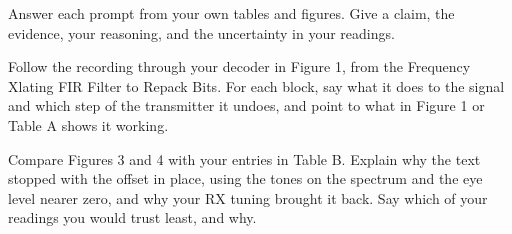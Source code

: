 \documentclass{exam}
\begin{document}
\begin{Form}
\begin{solution}[0in]
\end{solution}


\vspace{8pt}

\vspace{8pt}
\noindent{}\hfill
{}\par
{}\par

\par\vspace{0pt plus 3in}\vspace{0pt plus -3in}\vspace{8pt}

Answer each prompt from your own tables and figures. Give a claim, the evidence, your reasoning,
and the uncertainty in your readings.

\begin{questions}

\question Follow the recording through your decoder in Figure 1, from the Frequency Xlating FIR
Filter to Repack Bits. For each block, say what it does to the signal and which step of the
transmitter it undoes, and point to what in Figure 1 or Table A shows it working.
	\begin{solution}[2.0in]\end{solution}

\question Compare Figures 3 and 4 with your entries in Table B. Explain why the text stopped
with the offset in place, using the tones on the spectrum and the eye level nearer zero, and
why your RX tuning brought it back. Say which of your readings you would trust least, and why.
	\begin{solution}[2.0in]\end{solution}


\end{questions}
\end{Form}
\end{document}
